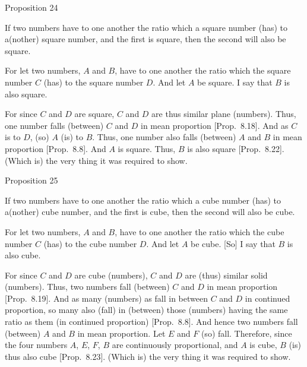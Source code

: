 
\begin{center}
{\large Proposition 24}
\end{center}

If two numbers have to one another the ratio
which a square number (has) to a(nother) square number, and
the first is  square, then the second will also be  square.

\epsfysize=0.5in
\centerline{}

For let two numbers, $A$ and $B$, have to one another the ratio which
the square number $C$ (has) to the square number $D$. And let
$A$ be square. I say that $B$ is also  square.

For since $C$ and $D$ are square, $C$ and $D$ are thus
similar plane (numbers). Thus, one number falls 
(between) $C$ and $D$ in mean proportion [Prop.~8.18]. And
as $C$ is to $D$, (so) $A$ (is) to $B$. Thus, one number also
falls  (between) $A$ and $B$ in mean proportion [Prop.~8.8]. And $A$ is  square. 
Thus, $B$ is also  square [Prop.~8.22].
(Which is) the very thing it was required to show.


\begin{center}
{\large Proposition 25}
\end{center}

If two numbers have to one another the
ratio which a cube number (has) to a(nother) cube number, and
the first is cube, then the second will also be cube.

\epsfysize=0.9in
\centerline{}

For  let two numbers, $A$ and $B$, have to one another the ratio which
the cube number $C$ (has) to the cube number $D$. And let $A$ be
 cube. [So] I say that $B$ is also  cube.
 
For since $C$ and $D$ are cube (numbers), $C$ and $D$ are (thus)
similar solid (numbers). Thus, two numbers fall
(between) $C$ and $D$  in mean proportion [Prop.~8.19]. And as many (numbers) as fall in between
$C$ and $D$  in continued proportion, so many also (fall)  in (between) those (numbers) having the same ratio as them (in continued proportion)
[Prop.~8.8].  And hence two numbers fall  (between) $A$ and $B$ in mean
proportion. Let $E$ and $F$ (so) fall.
Therefore, since the four numbers $A$, $E$, $F$, $B$ are continuously
proportional, and $A$ is  cube, $B$ (is) thus also 
cube [Prop.~8.23]. (Which is) the
very thing it was required to show.

